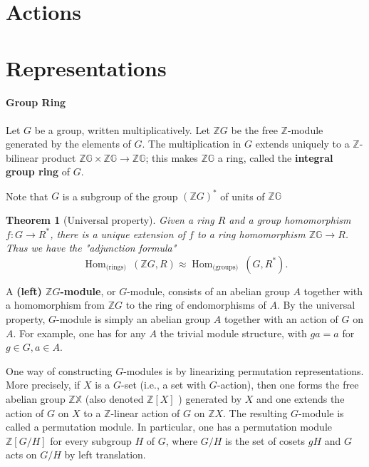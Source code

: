 \documentclass{book}
\newtheorem{theo}{Theorem}
\begin{document}
\section{Actions}

\section{Representations}


\paragraph*{Group Ring}

Let $G$ be a group, written multiplicatively. Let $\mathbb{Z} G$ be the free $\mathbb{Z}$-module generated by the elements of $G$. The multiplication in $G$ extends uniquely to a $\mathbb{Z}$-bilinear product $\mathbb{Z G} \times \mathbb{Z G} \rightarrow \mathbb{Z G}$; this makes $\mathbb{Z G}$ a ring, called the \textbf{integral group ring} of $G$.

Note that $G$ is a subgroup of the group $(\mathbb{Z} G)^*$ of units of $\mathbb{Z G}$ 
\begin{theo}[Universal property]
Given a ring $R$ and a group homomorphism $f: G \rightarrow R^*$, there is a unique extension of $f$ to a ring homomorphism $\mathbb{Z G} \rightarrow R$. Thus we have the "adjunction formula"
    $$
    \operatorname{Hom}_{\text {(rings) }}(\mathbb{Z} G, R) \approx \operatorname{Hom}_{\text {(groups) }}\left(G, R^*\right) .
    $$
\end{theo}

A \textbf{(left) $\mathbb{Z} G$-module}, or $G$-module, consists of an abelian group $A$ together with a homomorphism from $\mathbb{Z} G$ to the ring of endomorphisms of $A$. By the universal property, $G$-module is simply an abelian group $A$ together with an action of $G$ on $A$. For example, one has for any $A$ the trivial module structure, with $g a=a$ for $g \in G, a \in A$.

One way of constructing $G$-modules is by linearizing permutation representations. More precisely, if $X$ is a $G$-set (i.e., a set with $G$-action), then one forms the free abelian group $\mathbb{Z X}$ (also denoted $\mathbb{Z}[X]$ ) generated by $X$ and one extends the action of $G$ on $X$ to a $\mathbb{Z}$-linear action of $G$ on $\mathbb{Z} X$. The resulting $G$-module is called a permutation module. In particular, one has a permutation module $\mathbb{Z}[G / H]$ for every subgroup $H$ of $G$, where $G / H$ is the set of cosets $g H$ and $G$ acts on $G / H$ by left translation.
\end{document}
